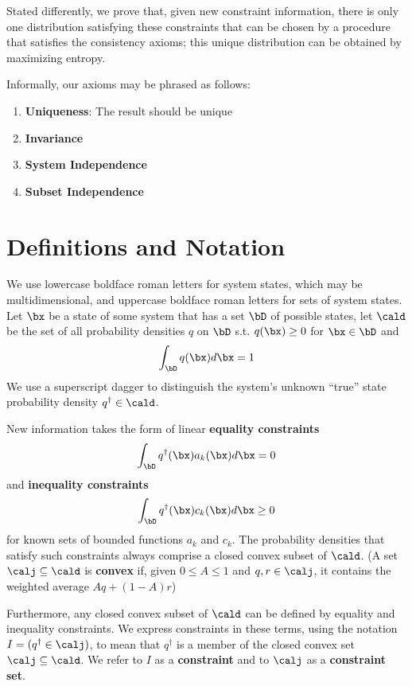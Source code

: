 \documentclass[11pt]{article}
\begin{document}
Stated differently, we prove that, given new constraint information, there is only one distribution
satisfying these constraints that can be chosen by a procedure that satisfies the consistency axioms;
this unique distribution can be obtained by maximizing entropy.

Informally, our axioms may be phrased as follows:
\begin{enumerate}
\item \textbf{Uniqueness}: The result should be unique
\item \textbf{Invariance}
\item \textbf{System Independence}
\item \textbf{Subset Independence}
\end{enumerate}
\section{Definitions and Notation}
\label{sec:org4ab3d98}
We use lowercase boldface roman letters for system states, which may be multidimensional, and
uppercase boldface roman letters for sets of system states. Let \(\bx\) be a state of some system that
has a set \(\bD\) of possible states, let \(\cald\) be the set of all probability densities \(q\) on
\(\bD\) s.t. \(q(\bx)\ge 0\) for \(\bx\in\bD\) and
\begin{equation*}
\int_{\bD}q(\bx)d\bx=1
\end{equation*}
We use a superscript dagger to distinguish the system's unknown ``true'' state probability density
\(q^\dag\in\cald\).

New information takes the form of linear \textbf{equality constraints}
\begin{equation*}
\int_{\bD}q^\dag(\bx)a_k(\bx)d\bx=0
\end{equation*}
and \textbf{inequality constraints}
\begin{equation*}
\int_{\bD}q^\dag(\bx)c_k(\bx)d\bx\ge 0
\end{equation*}
for known sets of bounded functions \(a_k\) and \(c_k\). The probability densities that satisfy such
constraints always comprise a closed convex subset of \(\cald\). (A set \(\calj\subseteq\cald\) is
\textbf{convex} if, given \(0\le A\le 1\) and \(q,r\in\calj\), it contains the weighted average \(Aq+(1-A)r\))

Furthermore, any closed convex subset of \(\cald\) can be defined by equality and inequality
constraints. We express constraints in these terms, using the notation \(I=(q^\dag\in\calj)\), to mean
that \(q^\dag\) is a member of the closed convex set \(\calj\subseteq\cald\). We refer to \(I\) as a
\textbf{constraint} and to \(\calj\) as a \textbf{constraint set}.
\end{document}
